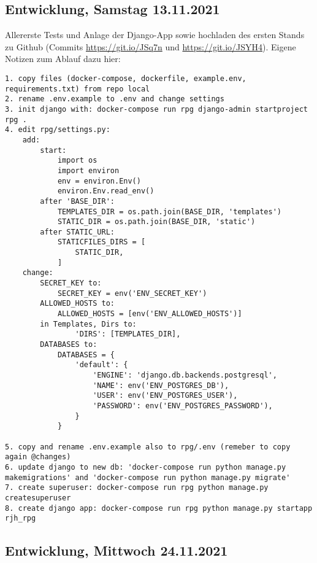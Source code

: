 \subsection{Entwicklung, Samstag 13.11.2021}

Allererste Tests und Anlage der Django-App sowie  hochladen des ersten Stands zu Github (Commits \url{https://git.io/JSq7n} und \url{https://git.io/JSYH4}). Eigene Notizen zum Ablauf dazu hier: 


\begin{lstlisting}
1. copy files (docker-compose, dockerfile, example.env, requirements.txt) from repo local
2. rename .env.example to .env and change settings 
3. init django with: docker-compose run rpg django-admin startproject rpg .
4. edit rpg/settings.py:
    add:
        start:
            import os
            import environ
            env = environ.Env()
            environ.Env.read_env()
        after 'BASE_DIR':
            TEMPLATES_DIR = os.path.join(BASE_DIR, 'templates')
            STATIC_DIR = os.path.join(BASE_DIR, 'static')
        after STATIC_URL:
            STATICFILES_DIRS = [
                STATIC_DIR,
            ]
    change: 
        SECRET_KEY to:
            SECRET_KEY = env('ENV_SECRET_KEY')
        ALLOWED_HOSTS to:
            ALLOWED_HOSTS = [env('ENV_ALLOWED_HOSTS')]
        in Templates, Dirs to:
                'DIRS': [TEMPLATES_DIR],
        DATABASES to:
            DATABASES = {
                'default': {
                    'ENGINE': 'django.db.backends.postgresql',
                    'NAME': env('ENV_POSTGRES_DB'),
                    'USER': env('ENV_POSTGRES_USER'),
                    'PASSWORD': env('ENV_POSTGRES_PASSWORD'),
                }
            }

5. copy and rename .env.example also to rpg/.env (remeber to copy again @changes)
6. update django to new db: 'docker-compose run python manage.py makemigrations' and 'docker-compose run python manage.py migrate'
7. create superuser: docker-compose run rpg python manage.py createsuperuser
8. create django app: docker-compose run rpg python manage.py startapp rjh_rpg 
\end{lstlisting}




\subsection{Entwicklung, Mittwoch 24.11.2021}

